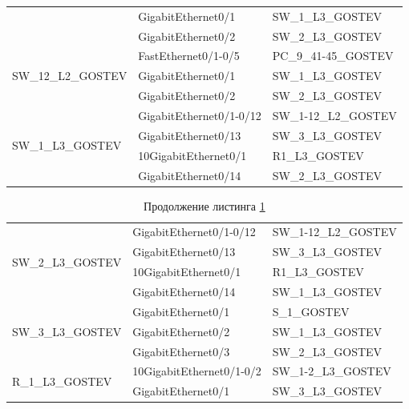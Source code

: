 \documentclass[14pt, a4paper]{extarticle}
\numberwithin{equation}{section}
\begin{document}
\begin{table}[H]
\begin{tabular}{|l|l|l|}
                                    & GigabitEthernet0/1       & SW\_1\_L3\_GOSTEV             \\ \cline{2-3} 
                                    & GigabitEthernet0/2       & SW\_2\_L3\_GOSTEV             \\ \hline
\multirow{3}{*}{SW\_12\_L2\_GOSTEV} & FastEthernet0/1-0/5      & PC\_9\_41-45\_GOSTEV          \\ \cline{2-3} 
                                    & GigabitEthernet0/1       & SW\_1\_L3\_GOSTEV             \\ \cline{2-3} 
                                    & GigabitEthernet0/2       & SW\_2\_L3\_GOSTEV             \\ \hline
\multirow{4}{*}{SW\_1\_L3\_GOSTEV}  & GigabitEthernet0/1-0/12  & SW\_1-12\_L2\_GOSTEV          \\ \cline{2-3} 
                                    & GigabitEthernet0/13      & SW\_3\_L3\_GOSTEV             \\ \cline{2-3} 
                                    & 10GigabitEthernet0/1     & R1\_L3\_GOSTEV                \\ \cline{2-3} 
                                    & GigabitEthernet0/14      & SW\_2\_L3\_GOSTEV             \\ 
\end{tabular}
\label{table:mainDepConnectionPlan}
\end{table}

\newpage
\begin{table}[H]
\small
\centering
\caption{Продолжение листинга \ref{table:mainDepConnectionPlan}}
\begin{tabular}{|l|l|l|}
\hline
\multirow{4}{*}{SW\_2\_L3\_GOSTEV}  & GigabitEthernet0/1-0/12  & SW\_1-12\_L2\_GOSTEV          \\ \cline{2-3} 
                                    & GigabitEthernet0/13      & SW\_3\_L3\_GOSTEV             \\ \cline{2-3} 
                                    & 10GigabitEthernet0/1     & R1\_L3\_GOSTEV                \\ \cline{2-3} 
                                    & GigabitEthernet0/14      & SW\_1\_L3\_GOSTEV             \\ \hline
\multirow{3}{*}{SW\_3\_L3\_GOSTEV}  & GigabitEthernet0/1       & S\_1\_GOSTEV                  \\ \cline{2-3} 
                                    & GigabitEthernet0/2       & SW\_1\_L3\_GOSTEV             \\ \cline{2-3} 
                                    & GigabitEthernet0/3       & SW\_2\_L3\_GOSTEV             \\ \hline
\multirow{2}{*}{R\_1\_L3\_GOSTEV}   & 10GigabitEthernet0/1-0/2 & SW\_1-2\_L3\_GOSTEV           \\ \cline{2-3} 
                                    & GigabitEthernet0/1       & SW\_3\_L3\_GOSTEV             \\ \hline
\end{tabular}
\end{table}
\end{document}
